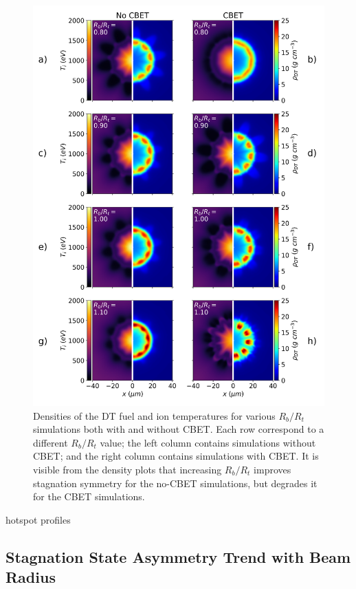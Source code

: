 \begin{figure}[t!]
    \includegraphics[width=0.9\linewidth]{Results1/Images/Stagnation_plots.png}
    \centering
    \caption{Densities of the DT fuel and ion temperatures for various $R_b/R_t$ simulations both with and without \ac{CBET}.
    Each row correspond to a different $R_b/R_t$ value; the left column contains simulations without \ac{CBET}; and the right column contains simulations with \ac{CBET}.
    It is visible from the density plots that increasing $R_b/R_t$ improves stagnation symmetry for the no-\ac{CBET} simulations, but degrades it for the \ac{CBET} simulations.}%
    \label{fig:Res1_stagnation_plots}
\end{figure}

hotspot profiles



\subsection{Stagnation State Asymmetry Trend with Beam Radius}%
\label{sec:Res1_stagnation_asymm_trend}

